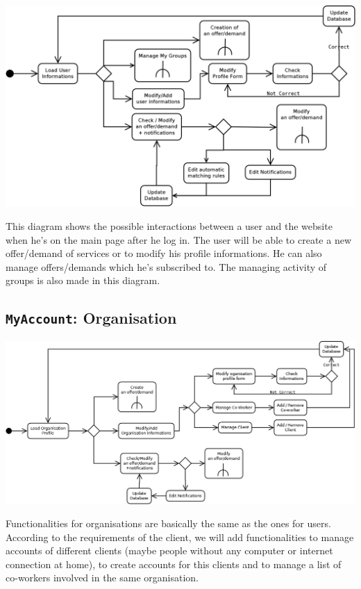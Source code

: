 \begin{center}
	\includegraphics[width=1\textwidth]{MyAccount_User.png}
\end{center}
This diagram shows the possible interactions between a user and the website when he's on the main page after he log in. The user will be able to create a new offer/demand of services or to modify his profile informations. He can also manage offers/demands which he's subscribed to. The managing activity of groups is also made in this diagram.

\subsection{\texttt{MyAccount}: Organisation}

\begin{center}
	\includegraphics[width=1\textwidth]{MyAccount_Org.png}
\end{center}
Functionalities for organisations are basically the same as the ones for users. According to the requirements of the client, we will add functionalities to manage accounts of different clients (maybe people without any computer or internet connection at home), to create accounts for this clients and to manage a list of co-workers involved in the same organisation.


